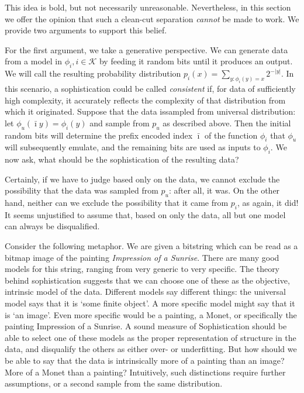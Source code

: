 \documentclass{style/llncs}
\newcommand{\K}{\mathscr K}
\begin{document}
This idea is bold, but not necessarily unreasonable. Nevertheless, in this section we offer the opinion that such a clean-cut separation \emph{cannot} be made to work. We provide two arguments to support this belief.

For the first argument, we take a generative perspective. We can generate data from a model in $\phi_i, i \in \K$ by feeding it random bits until it produces an output. We will call the resulting probability distribution $p_i(x) = \sum_{y:\phi_i(y) = x} 2^{-|y|}$. In this scenario, a sophistication could be called \emph{consistent} if, for data of sufficiently high complexity, it accurately reflects the complexity of that distribution from which it originated. Suppose that the data issampled from  universal distribution: let $\phi_u(\bar\imath y)=\phi_i(y)$ and sample from $p_u$ as described above. Then the initial random bits will determine the prefix encoded index $\bar\imath$ of the function $\phi_i$ that $\phi_u$ will subsequently emulate, and the remaining bits are used as inputs to $\phi_i$. We now ask, what should be the sophistication of the resulting data?

Certainly, if we have to judge based only on the data, we cannot exclude the possibility that the data was sampled from $p_u$: after all, it was.  On the other hand, neither can we exclude the possibility that it came from $p_i$, as again, it did! It seems unjustified to assume that, based on only the data, all but one model can always be disqualified.

Consider the following metaphor. We are given a bitstring which can be read as a bitmap image of the painting \emph{Impression of a Sunrise}. There are many good models for this string, ranging from very generic to very specific. The theory behind sophistication suggests that we can choose one of these as the objective, intrinsic model of the data. Different models say different things: the universal model says that it is `some finite object'. A more specific model might say that it is `an image'. Even more specific would be a painting, a Monet, or specifically the painting Impression of a Sunrise. A sound measure of Sophistication should be able to select one of these models as the proper representation of structure in the data, and disqualify the others as either over- or underfitting. But how should we be able to say that the data is intrinsically more of a painting than an image? More of a Monet than a painting? Intuitively, such distinctions require further assumptions, or a second sample from the same distribution.
\end{document}
